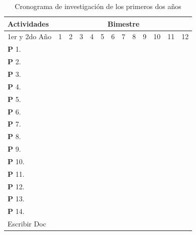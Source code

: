 {\begin{table}[!htb]
    \newcommand{\Bk}{\multicolumn{1}{G}{ }}
    \begin{tabular}{|p{3.0cm}||c|c|c|c|c|c|c|c|c|c|c|c|}\hline
      Actividades&\multicolumn{12}{|c|}{Bimestre}\\\hline\hline
      1er y  2do A\~no&1&2 &3  &4  &5  &6  &7  &8  &9  &10 &11 &12 \\\hline
      \textbf{P} 1. &\Bk&   &   &   &   &\Bk&   &   &   &\Bk&   &   \\\hline
      \textbf{P} 2. &\Bk&\Bk&   &   &\Bk&\Bk&   &\Bk&\Bk&\Bk&\Bk&\Bk\\\hline
      \textbf{P} 3. &   &\Bk&   &   &\Bk&\Bk&   &\Bk&\Bk&\Bk&\Bk&\Bk\\\hline
      \textbf{P} 4. &   &\Bk&   &   &   &\Bk&\Bk&\Bk&\Bk&\Bk&\Bk&\Bk\\\hline
      \textbf{P} 5. &\Bk&   &   &\Bk&   &\Bk&   &   &   &\Bk&   &   \\\hline
      \textbf{P} 6. &\Bk&   &   &\Bk&   &\Bk&   &   &   &\Bk&   &   \\\hline
      \textbf{P} 7. &   &   &\Bk&\Bk&\Bk&   &\Bk&\Bk&\Bk&   &\Bk&\Bk\\\hline
      \textbf{P} 8. &   &\Bk&   &\Bk&   &\Bk&   &   &   &\Bk&   &   \\\hline
      \textbf{P} 9. &   &   &   &\Bk&   &   &\Bk&\Bk&\Bk&   &\Bk&\Bk\\\hline
      \textbf{P} 10.&   &   &\Bk&\Bk&\Bk&   &\Bk&\Bk&\Bk&   &\Bk&\Bk\\\hline
      \textbf{P} 11.&   &   &\Bk&\Bk&\Bk&   &\Bk&\Bk&\Bk&   &\Bk&\Bk\\\hline
      \textbf{P} 12.&   &   &   &   &\Bk&   &   &\Bk&\Bk&   &\Bk&\Bk\\\hline
      \textbf{P} 13.&   &   &   &   &   &   &   &   &   &   &   &   \\\hline
      \textbf{P} 14.&   &   &   &   &   &   &   &   &   &   &   &   \\\hline
      Escribir Doc &   &\Bk&   &\Bk&   &\Bk&   &\Bk&   &\Bk&   &\Bk\\\hline    
    \end{tabular}
    \caption{Cronograma de investigaci\'on de los primeros dos a\~nos}
    \label{tab:crono}
  \end{table}
  \begin{table}[!htb]
    \centering
    \newcommand{\Bk}{\multicolumn{1}{|G|}{ }}
    \begin{tabular}{|p{3.0cm}||c|c|c|c|c|c|c|c|c|c|c|c|}\hline

\end{tabular}
\end{table}}
